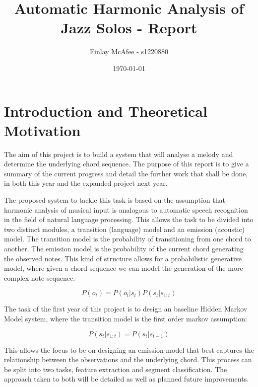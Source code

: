 \documentclass[bsc,singlespacing,parskip,deptreport]{infthesis}
\begin{document}
\title{Automatic Harmonic Analysis of Jazz Solos - Report}

\author{Finlay McAfee - s1220880}


\date{\today
}


\maketitle




\chapter{Introduction and Theoretical Motivation}

The aim of this project is to build a system that will analyse a melody and determine the underlying chord sequence. The purpose of this report is to give a summary of the current progress and detail the further work that shall be done, in both this year and the expanded project next year.

The proposed system to tackle this task is based on the assumption that harmonic analysis of musical input is analogous to automatic speech recognition in the field of natural language processing. This allows the task to be divided into two distinct modules, a transition (language) model and an emission (acoustic) model. The transition model is the probability of transitioning from one chord to another. The emission model is the probability of the current chord generating the observed notes. This kind of structure allows for a probabilistic generative model, where given a chord sequence we can model the generation of the more complex note sequence.

$$
P(o_t) = P(o_t | s_t)P(s_t | s_{1:t}) 
$$

The task of the first year of this project is to design an baseline Hidden Markov Model system, where the transition model is the first order markov assumption:

$$
P(s_t | s_{1:t}) = P(s_t | s_{t-1}) 
$$

This allows the focus to be on designing an emission model that best captures the relationship between the observations and the underlying chord. This process can be split into two tasks, feature extraction and segment classification. The approach taken to both will be detailed as well as planned future improvements.
\end{document}
